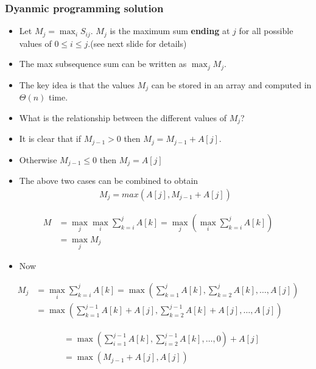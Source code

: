 \documentclass{beamer}
\begin{document}
\begin{frame}
  \frametitle{Dyanmic programming solution}
  \begin{itemize}
  \item Let $M_j=\max_{i}S_{ij}$. $M_j$ is the maximum sum \textbf{ending} at $j$ for all possible values of $0\le i\le j$.(see next slide for details)
\item The max subsequence sum can be written as $\max_{j}M_j$.
\item The key idea is that the values $M_j$ can be stored in an array and computed in $\Theta(n)$ time.
\item What is the relationship between the different values of $M_j$?
\item It is clear that if $M_{j-1}>0$ then $M_j=M_{j-1}+A[j]$.
\item Otherwise $M_{j-1}\le0$ then $M_j=A[j]$
\item The above two cases can be combined to obtain 
  \begin{align*}
    M_j=max(A[j],M_{j-1}+A[j])
  \end{align*}
  \end{itemize}
\end{frame}
\begin{frame}
  \begin{align*}
    M&=\max_j\max_i\sum_{k=i}^jA[k]=\max_j\left(\max_i\sum_{k=i}^jA[k]\right)\\
    &=\max_j M_j
  \end{align*}
  \begin{itemize}
    \item Now
  \end{itemize}
  \begin{align*}
    M_j&=\max_i\sum_{k=i}^jA[k]=\max(\sum_{k=1}^jA[k],\sum_{k=2}^jA[k],\ldots, A[j])\\
    &=\max(\sum_{k=1}^{j-1}A[k]+A[j],\sum_{k=2}^{j-1}A[k]+A[j],\ldots, A[j])
  \end{align*}
\end{frame}
\begin{frame}
  \begin{align*}
    &=\max\left(\sum_{i=1}^{j-1}A[k],\sum_{i=2}^{j-1}A[k],\ldots,0\right)+A[j]\\
    &=\max(M_{j-1}+A[j],A[j])
  \end{align*}
\end{frame}
\end{document}
